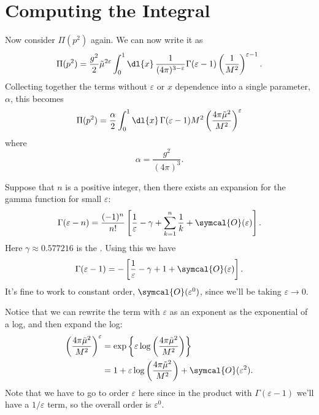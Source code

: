 \documentclass[fleqn]{NotesClass}
\newcommand{\order}{\symcal{O}}
\begin{document}
    \section{Computing the Integral}
    Now consider \(\Pi(p^2)\) again.
    We can now write it as
    \begin{equation}
        \Pi(p^2) = \frac{g^2}{2} \tilde{\mu}^{2\varepsilon} \int_0^1 \dl{x} \, \frac{1}{(4\pi)^{3-\varepsilon}} \Gamma(\varepsilon - 1) \left( \frac{1}{M^2} \right)^{\varepsilon - 1}.
    \end{equation}
    Collecting together the terms without \(\varepsilon\) or \(x\) dependence into a single parameter, \(\alpha\), this becomes
    \begin{equation}
        \Pi(p^2) = \frac{\alpha}{2} \int_0^1 \dl{x} \, \Gamma(\varepsilon - 1) M^2 \left( \frac{4\pi \tilde{\mu}^2}{M^2} \right)^{\varepsilon}
    \end{equation}
    where
    \begin{equation}
        \alpha = \frac{g^2}{(4\pi)^3}.
    \end{equation}
    
    Suppose that \(n\) is a positive integer, then there exists an expansion for the gamma function for small \(\varepsilon\):
    \begin{equation}
        \Gamma(\varepsilon - n) = \frac{(-1)^{n}}{n!} \left[ \frac{1}{\varepsilon} - \gamma + \sum_{k=1}^{n} \frac{1}{k} + \order(\varepsilon) \right].
    \end{equation}
    Here \(\gamma \approx 0.577216\) is the .
    Using this we have
    \begin{equation}
        \Gamma(\varepsilon - 1) = -\left[ \frac{1}{\varepsilon} - \gamma + 1 + \order(\varepsilon) \right].
    \end{equation}
    It's fine to work to constant order, \(\order(\varepsilon^0)\), since we'll be taking \(\varepsilon \to 0\).
    
    Notice that we can rewrite the term with \(\varepsilon\) as an exponent as the exponential of a log, and then expand the log:
    \begin{align}
        \left( \frac{4\pi\tilde{\mu}^2}{M^2} \right)^{\varepsilon} &= \exp\left\{ \varepsilon \log\left( \frac{4\pi\tilde{\mu}^2}{M^2} \right) \right\}\\
        &= 1 + \varepsilon \log\left( \frac{4\pi\tilde{\mu}^2}{M^2} \right) + \order(\varepsilon^2).
    \end{align}
    Note that we have to go to order \(\varepsilon\) here since in the product with \(\Gamma(\varepsilon - 1)\) we'll have a \(1/\varepsilon\) term, so the overall order is \(\varepsilon^0\).
    
\end{document}
